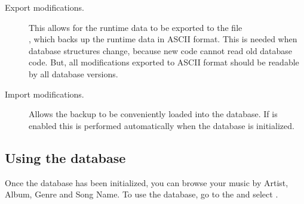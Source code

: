 \begin{description}
\item[Export modifications.]
  This allows for the runtime data to be exported to the file \\
  , which backs up the runtime data in
  ASCII format. This is needed when database structures change, because new
  code cannot read old database code. But, all modifications
  exported to ASCII format should be readable by all database versions.
  
\item[Import modifications.]
  Allows the  backup to be 
  conveniently loaded into the database. If  is
  enabled this is performed automatically when the database is initialized.
  
\end{description}

\subsection{Using the database}
Once the database has been initialized, you can browse your music by Artist, 
Album, Genre and Song Name. To use the database, go to the 
and select .\\

